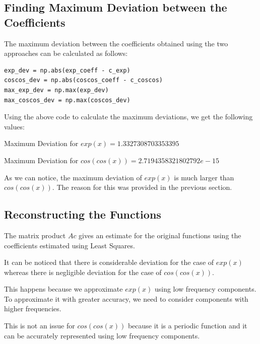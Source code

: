 \documentclass{article}
\begin{document}
\subsection{Finding Maximum Deviation between the Coefficients}
The maximum deviation between the coefficients obtained using the two approaches can be calculated as follows:
\begin{verbatim}
exp_dev = np.abs(exp_coeff - c_exp)
coscos_dev = np.abs(coscos_coeff - c_coscos)
max_exp_dev = np.max(exp_dev)
max_coscos_dev = np.max(coscos_dev)
\end{verbatim}
Using the above code to calculate the maximum deviations, we get the following values:
\begin{center}
    Maximum Deviation for $exp(x) = 1.3327308703353395$
    
    Maximum Deviation for $cos(cos(x)) = 2.7194358321802792e-15$
\end{center}
As we can notice, the maximum deviation of $exp(x)$ is much larger than $cos(cos(x))$. The reason for this was provided in the previous section.

\subsection{Reconstructing the Functions}
The matrix product $Ac$ gives an estimate for the original functions using the coefficients estimated using Least Squares.

It can be noticed that there is considerable deviation for the case of $exp(x)$ whereas there is negligible deviation for the case of $cos(cos(x))$.

This happens because we approximate $exp(x)$ using low frequency components. To approximate it with greater accuracy, we need to consider components with higher frequencies.

This is not an issue for $cos(cos(x))$ because it is a periodic function and it can be accurately represented using low frequency components.
\end{document}

